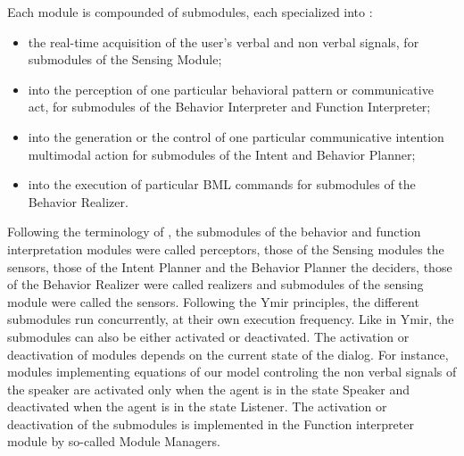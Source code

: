 Each module is compounded of submodules, each specialized into : \begin{itemize}
	\item the real-time acquisition of the user's verbal and non verbal signals, for submodules of the Sensing Module;
	\item into the perception of one particular behavioral pattern or communicative act, for submodules of the Behavior Interpreter and Function Interpreter;
	\item into the generation or the control of one particular communicative intention multimodal action for submodules of the Intent and Behavior Planner;
	\item into the execution of particular BML commands for submodules of the Behavior Realizer.
	\end{itemize}		
	Following the terminology of \cite{thorisson_mind_1999}, the submodules of the behavior and function interpretation modules were called perceptors, those of the Sensing modules the sensors, those of the Intent Planner and the Behavior Planner the deciders, those of the Behavior Realizer were called realizers and submodules of the sensing module were called the sensors.  
Following the Ymir principles, the different submodules run concurrently, at their own execution frequency. 
Like in Ymir, the submodules can also be either activated or deactivated. 
The activation or deactivation of modules depends on the current state of the dialog. 
For instance, modules implementing equations of our model controling the non verbal signals of the speaker are activated only when the agent is in the state Speaker and deactivated when the agent is in the state Listener. 
The activation or deactivation of the submodules is implemented in the Function interpreter module by so-called Module Managers. 

